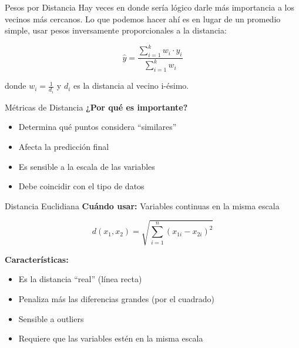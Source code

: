 \documentclass{beamer}
\begin{document}
\begin{frame}{Pesos por Distancia}
    Hay veces en donde sería lógico darle más importancia a los vecinos más cercanos. Lo que podemos hacer ahí es en lugar de un promedio simple, usar pesos inversamente proporcionales a la distancia:

    \[\hat{y} = \frac{\sum_{i=1}^{k} w_i \cdot y_i}{\sum_{i=1}^{k} w_i}\]
    
    donde $w_i = \frac{1}{d_i}$ y $d_i$ es la distancia al vecino i-ésimo.
\end{frame}

\begin{frame}{Métricas de Distancia}
    \textbf{¿Por qué es importante?}
    \begin{itemize}
        \item Determina qué puntos considera ``similares''
        \item Afecta la predicción final
        \item Es sensible a la escala de las variables
        \item Debe coincidir con el tipo de datos
    \end{itemize}
\end{frame}

\begin{frame}{Distancia Euclidiana}
    \textbf{Cuándo usar:} Variables continuas en la misma escala
    
    \[d(x_1, x_2) = \sqrt{\sum_{i=1}^{n} (x_{1i} - x_{2i})^2}\]
    
    \vspace{0.3cm}
    
    \textbf{Características:}
    \begin{itemize}
        \item Es la distancia ``real'' (línea recta)
        \item Penaliza más las diferencias grandes (por el cuadrado)
        \item Sensible a outliers
        \item Requiere que las variables estén en la misma escala
    \end{itemize}
\end{frame}
\end{document}
